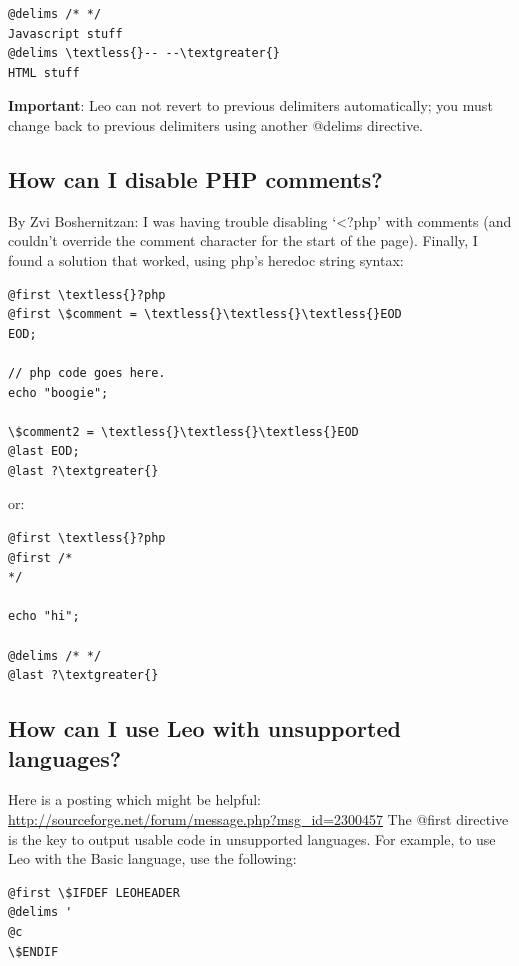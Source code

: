 \documentclass[a4paper,10pt,english]{sphinxmanual}
\begin{document}
\begin{Verbatim}[commandchars=\\\{\}]
@delims /* */
Javascript stuff
@delims \textless{}-- --\textgreater{}
HTML stuff
\end{Verbatim}

\textbf{Important}: Leo can not revert to previous delimiters automatically;
you must change back to previous delimiters using another @delims directive.


\subsection{How can I disable PHP comments?}
\label{FAQ:how-can-i-disable-php-comments}
By Zvi Boshernitzan: I was having trouble disabling `\textless{}?php' with comments (and
couldn't override the comment character for the start of the page). Finally, I
found a solution that worked, using php's heredoc string syntax:

\begin{Verbatim}[commandchars=\\\{\}]
@first \textless{}?php
@first \$comment = \textless{}\textless{}\textless{}EOD
EOD;

// php code goes here.
echo "boogie";

\$comment2 = \textless{}\textless{}\textless{}EOD
@last EOD;
@last ?\textgreater{}
\end{Verbatim}

or:

\begin{Verbatim}[commandchars=\\\{\}]
@first \textless{}?php
@first /*
*/

echo "hi";

@delims /* */
@last ?\textgreater{}
\end{Verbatim}


\subsection{How can I use Leo with unsupported languages?}
\label{FAQ:how-can-i-use-leo-with-unsupported-languages}
Here is a posting which might be helpful:
\href{http://sourceforge.net/forum/message.php?msg\_id=2300457}{http://sourceforge.net/forum/message.php?msg\_id=2300457} The @first
directive is the key to output usable code in unsupported languages. For
example, to use Leo with the Basic language, use the following:

\begin{Verbatim}[commandchars=\\\{\}]
@first \$IFDEF LEOHEADER
@delims '
@c
\$ENDIF
\end{Verbatim}
\end{document}
